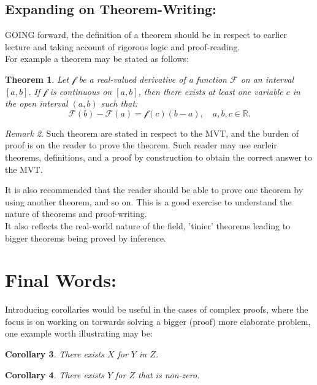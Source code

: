 \documentclass[10pt]{article}
\theoremstyle{plain}
\newtheorem{theorem}{Theorem}[section]
\newtheorem{corollary}[theorem]{Corollary}
\theoremstyle{definition}
\theoremstyle{remark}
\newtheorem{remark}[theorem]{Remark}
\begin{document}
\subsection{Expanding on Theorem-Writing:}

\lettrine[lines=2, lhang=0.1, loversize=0.2]{G}OING forward, the definition of a theorem should be in respect to earlier lecture and taking account of rigorous logic and proof-reading.\\
For example a theorem may be stated as follows:

\begin{theorem}
	Let $\mathcal{f}$ be a real-valued derivative of a function $\mathcal{F}$ on an interval $[a, b]$. If $\mathcal{f}$ is continuous on $[a, b]$, then there exists at least one variable $c$ in the open interval $(a, b)$ such that:
	\begin{equation}
		\mathcal{F}(b) - \mathcal{F}(a) = \mathcal{f}(c)(b - a), \quad a, b, c \in \mathbb{R}.
	\end{equation}
\end{theorem}
\begin{remark}
	Such theorem are stated in respect to the MVT, and the burden of proof is on the reader to prove the theorem. Such reader may use earleir theorems, definitions, and a proof by construction to obtain the correct answer to the MVT.
\end{remark}
It is also recommended that the reader should be able to prove one theorem by using another theorem, and so on. This is a good exercise to understand the nature of theorems and proof-writing.\\
It also reflects the real-world nature of the field, 'tinier' theorems leading to bigger theorems being proved by inference. 

\section{Final Words:}

Introducing corollaries would be useful in the cases of complex proofs, where the focus is on working on torwards solving a bigger (proof) more elaborate problem, one example worth illustrating may be:

\begin{corollary}
	There exists $X$ for $Y$ in $Z$.
\end{corollary}

\begin{corollary}
	There exists $Y$ for $Z$ that is non-zero.
\end{corollary}
\end{document}
